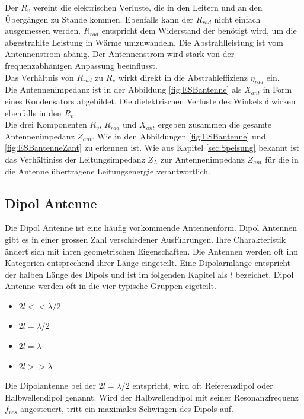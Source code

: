 Der $R_{v}$ vereint die elektrischen Verluste, die in den Leitern und an den Übergängen zu Stande kommen. Ebenfalls kann der $R_{rad}$ nicht einfach ausgemessen werden. $R_{rad}$ entspricht dem Widerstand der benötigt wird, um  die abgestrahlte Leistung in Wärme umzuwandeln. Die Abstrahlleistung ist vom Antennenstrom abänig. Der Antennenstrom wird stark von der frequenzabhänigen Anpassung beeinflusst.\\
Das Verhältnis von $R_{rad}$  zu $R_{v}$ wirkt direkt in die Abstrahleffizienz $\eta_{rad}$ ein. \\
Die Antennenimpedanz ist in der Abbildung \ref{fig:ESBantenne} als $X_{ant}$ in Form eines Kondensators abgebildet. Die dielektrischen Verluste des Winkels $\delta$ wirken ebenfalls in den $R_{v}$.\\
Die drei Komponenten $R_{v}$, $R_{rad}$ und $X_{ant}$ ergeben zusammen die gesamte Antennenimpedanz $Z_{ant}$. Wie in den Abbildungen \ref{fig:ESBantenne} und \ref{fig:ESBantenneZant} zu erkennen ist. Wie aus Kapitel \ref{sec:Speisung} bekannt ist das Verhältiniss der Leitungsimpedanz $Z_L$ zur Antennenimpedanz $Z_{ant}$ für die in die Antenne übertragene Leitungsenergie verantwortlich.


\subsection{Dipol Antenne}
Die Dipol Antenne ist eine häufig vorkommende Antennenform.  Dipol Antennen gibt es in einer grossen Zahl verschiedener Ausführungen. Ihre Charakteristik ändert sich mit ihren geometrischen Eigenschaften. Die Antennen werden oft ihn Kategorien entsprechend ihrer Länge eingeteilt. Eine Dipolarmlänge entspricht der halben Länge des Dipols und ist im folgenden Kapitel als $l$ bezeichet. Dipol Antenne werden oft in die  vier typische Gruppen eigeteilt. 
\begin{itemize}
\item $2l<< \lambda/2 $
\item $2l = \lambda/2 $
\item $2l = \lambda $
\item $2l>> \lambda $
\end{itemize} 
Die Dipolantenne bei der $2l=\lambda/2$ entspricht, wird oft Referenzdipol oder Halbwellendipol genannt. Wird der Halbwellendipol mit seiner Resonanzfrequenz $f_{res}$ angesteuert, tritt ein maximales Schwingen des Dipols auf. 

